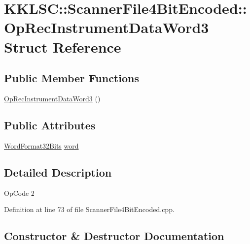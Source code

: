 \hypertarget{struct_scanner_file4_bit_encoded_1_1_op_rec_instrument_data_word3}{}\section{K\+K\+L\+SC\+:\+:Scanner\+File4\+Bit\+Encoded\+:\+:Op\+Rec\+Instrument\+Data\+Word3 Struct Reference}
\label{struct_scanner_file4_bit_encoded_1_1_op_rec_instrument_data_word3}
\subsection*{Public Member Functions}
\begin{DoxyCompactItemize}
\item 
\hyperlink{struct_scanner_file4_bit_encoded_1_1_op_rec_instrument_data_word3_ae47b1884f96b194afb446dcb92a70dbe}{Op\+Rec\+Instrument\+Data\+Word3} ()
\end{DoxyCompactItemize}
\subsection*{Public Attributes}
\begin{DoxyCompactItemize}
\item 
\hyperlink{union_k_k_b_1_1_word_format32_bits}{Word\+Format32\+Bits} \hyperlink{struct_scanner_file4_bit_encoded_1_1_op_rec_instrument_data_word3_a261357052b9e92279e3cd1833933f9b5}{word}
\end{DoxyCompactItemize}


\subsection{Detailed Description}
Op\+Code 2 

Definition at line 73 of file Scanner\+File4\+Bit\+Encoded.\+cpp.



\subsection{Constructor \& Destructor Documentation}
